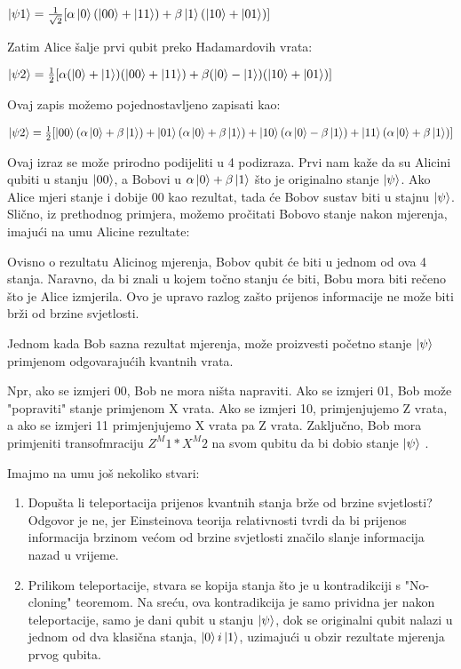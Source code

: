 \documentclass{article}
\begin{document}
{\centering
	$\ket{\psi1}  = \frac{1}{\sqrt{2}} [ \alpha\ket{0}(\ket{00}+\ket{11}) +   \beta\ket{1}(\ket{10}+\ket{01})]$ 
	\par
}
\newline
\break

Zatim Alice šalje prvi qubit preko Hadamardovih vrata:

{\centering
	$\ket{\psi2}  = \frac{1}{2} [ \alpha(\ket{0}+\ket{1})(\ket{00}+\ket{11}) +   \beta(\ket{0}-\ket{1})(\ket{10}+\ket{01})]$ 
	\par
}
\newline

Ovaj zapis možemo pojednostavljeno zapisati kao:

{\centering
	$\ket{\psi2}  = \frac{1}{2} [\ket{00} (\alpha\ket{0} + \beta\ket{1}) + \ket{01} (\alpha\ket{0} + \beta\ket{1}) 
	+ \ket{10} (\alpha\ket{0} - \beta\ket{1}) + \ket{11} (\alpha\ket{0} + \beta\ket{1})] $ 
	\par
}
\bigbreak
Ovaj izraz se može prirodno podijeliti u 4 podizraza. Prvi nam kaže da su Alicini qubiti u stanju $\ket {00}$, a Bobovi u $\alpha\ket{0} +\beta \ket {1}$ što je originalno stanje $\ket {\psi}$.
Ako Alice mjeri stanje i dobije 00 kao rezultat, tada će Bobov sustav biti u stajnu $\ket {\psi}$.
Slično, iz prethodnog primjera, možemo pročitati Bobovo stanje nakon mjerenja, imajući na umu Alicine rezultate:

Ovisno o rezultatu Alicinog mjerenja, Bobov qubit će biti u jednom od ova 4 stanja. Naravno, da bi znali u kojem točno stanju će biti, Bobu mora biti rečeno što je Alice izmjerila. Ovo je upravo razlog zašto prijenos informacije ne može biti brži od brzine svjetlosti.

Jednom kada Bob sazna rezultat mjerenja, može proizvesti početno stanje $\ket{\psi}$ primjenom odgovarajućih kvantnih vrata.

Npr, ako se izmjeri 00, Bob ne mora ništa napraviti.
Ako se izmjeri 01, Bob može "popraviti" stanje primjenom X vrata.
Ako se izmjeri 10, primjenjujemo Z vrata, a ako se izmjeri 11 primjenjujemo X vrata pa Z vrata. 
Zaključno, Bob mora primjeniti transofmraciju $Z^M1*X^M2$ na svom qubitu da bi dobio stanje  $\ket{\psi}$ .


Imajmo na umu još nekoliko stvari:
\begin{enumerate}
	\item  Dopušta li teleportacija prijenos kvantnih stanja brže od brzine svjetlosti? Odgovor je ne, jer Einsteinova teorija relativnosti tvrdi da bi prijenos informacija brzinom većom od brzine svjetlosti značilo slanje informacija nazad u vrijeme.
	\item  Prilikom teleportacije, stvara se kopija stanja što je u kontradikciji s "No-cloning" teoremom. Na sreću, ova kontradikcija je samo prividna jer nakon teleportacije, samo je dani qubit u stanju  $\ket{\psi}$, dok se originalni qubit nalazi u jednom od dva klasična stanja, $\ket {0} i \ket {1}$, uzimajući u obzir rezultate mjerenja prvog qubita.
\end{enumerate}
\end{document}
